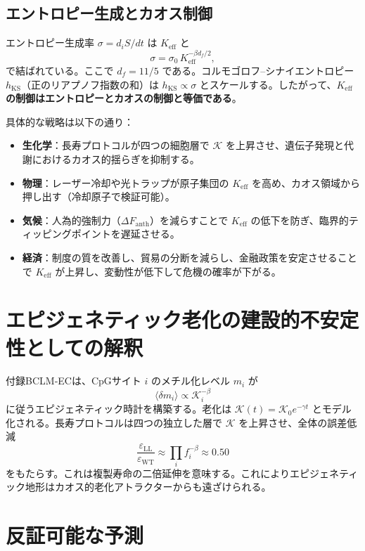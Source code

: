 \documentclass[12pt,a4paper]{article}
\newcommand{\Keff}{K_{\mathrm{eff}}}
\newcommand{\REL}{\mathcal{K}}
\begin{document}
	\subsection{エントロピー生成とカオス制御}
	
	エントロピー生成率 \(\sigma = d_iS/dt\) は \(\Keff\) と
	\[
	\sigma = \sigma_0\, \Keff^{-\beta d_f/2},
	\]
	で結ばれている。ここで \(d_f = 11/5\) である。コルモゴロフ–シナイエントロピー \(h_{\mathrm{KS}}\)（正のリアプノフ指数の和）は \(h_{\mathrm{KS}} \propto \sigma\) とスケールする。したがって、\textbf{\(\Keff\) の制御はエントロピーとカオスの制御と等価である}。
	
	具体的な戦略は以下の通り：
	\begin{itemize}
		\item \textbf{生化学}：長寿プロトコルが四つの細胞層で \(\REL\) を上昇させ、遺伝子発現と代謝におけるカオス的揺らぎを抑制する。
		\item \textbf{物理}：レーザー冷却や光トラップが原子集団の \(\Keff\) を高め、カオス領域から押し出す（冷却原子で検証可能）。
		\item \textbf{気候}：人為的強制力（\(\Delta F_{\mathrm{anth}}\)）を減らすことで \(\Keff\) の低下を防ぎ、臨界的ティッピングポイントを遅延させる。
		\item \textbf{経済}：制度の質を改善し、貿易の分断を減らし、金融政策を安定させることで \(\Keff\) が上昇し、変動性が低下して危機の確率が下がる。
	\end{itemize}
	
	\section{エピジェネティック老化の建設的不安定性としての解釈}
	
	付録BCLM‑ECは、CpGサイト \(i\) のメチル化レベル \(m_i\) が
	\[
	\langle \delta m_i \rangle \propto \REL_i^{-\beta}
	\]
	に従うエピジェネティック時計を構築する。老化は \(\REL(t) = \REL_0 e^{-\gamma t}\) とモデル化される。長寿プロトコルは四つの独立した層で \(\REL\) を上昇させ、全体の誤差低減
	\[
	\frac{\varepsilon_{\mathrm{LL}}}{\varepsilon_{\mathrm{WT}}} \approx \prod_i f_i^{-\beta}
	\approx 0.50
	\]
	をもたらす。これは複製寿命の二倍延伸を意味する。これによりエピジェネティック地形はカオス的老化アトラクターからも遠ざけられる。
	
	\section{反証可能な予測}
	
\end{document}
